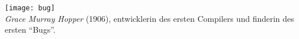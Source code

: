 \texttt{[image: bug]}\\
\emph{Grace Murray Hopper} (1906), entwicklerin des ersten Compilers und finderin des ersten ``Bugs''.\\
